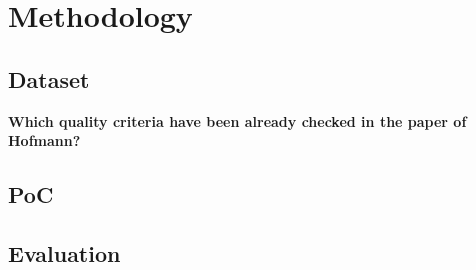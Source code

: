 \documentclass[a4paper, 11 pt, leqno, titlepage = true, toc=bib, oneside]{scrbook}
\begin{document}
\chapter{Methodology}
\section{Dataset}
\textbf{Which quality criteria have been already checked in the paper of Hofmann?}
\section{PoC}
\section{Evaluation}





\end{document}
